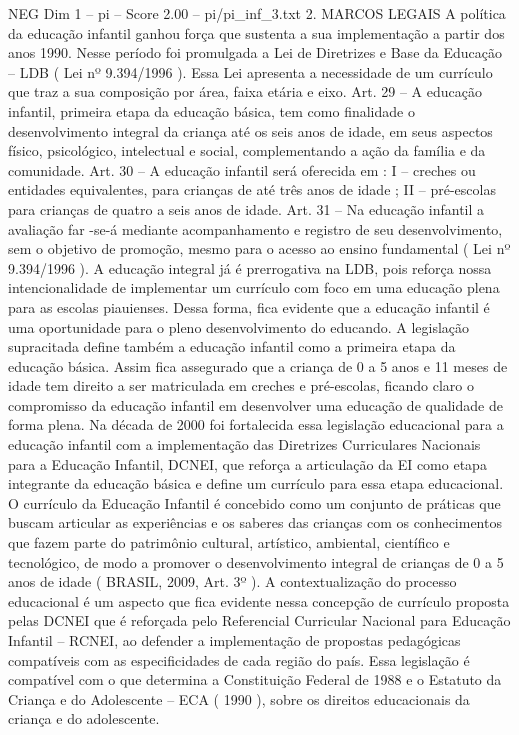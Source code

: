 \begin{textsample}{NEG Dim 1 – pi – Score 2.00 – pi/pi\_inf\_3.txt}  \label{ex:f1_neg_231}
2.
MARCOS LEGAIS A política da educação infantil ganhou força que sustenta a sua implementação a partir dos anos 1990.
Nesse período foi promulgada a Lei de Diretrizes e Base da Educação – LDB ( Lei nº 9.394/1996 ).
Essa Lei apresenta a necessidade de um currículo que traz a sua composição por área, faixa etária e eixo.
Art. 29 – A educação infantil, primeira etapa da educação básica, tem como finalidade o desenvolvimento integral da criança até os seis anos de idade, em seus aspectos físico, psicológico, intelectual e social, complementando a ação da família e da comunidade.
Art. 30 – A educação infantil será oferecida em : I – creches ou entidades equivalentes, para crianças de até três anos de idade ; II – pré-escolas para crianças de quatro a seis anos de idade.
Art. 31 – Na educação infantil a avaliação far -se-á mediante acompanhamento e registro de seu desenvolvimento, sem o objetivo de promoção, mesmo para o acesso ao ensino fundamental ( Lei nº 9.394/1996 ).
A educação integral já é prerrogativa na LDB, pois reforça nossa intencionalidade de implementar um currículo com foco em uma educação plena para as escolas piauienses.
Dessa forma, fica evidente que a educação infantil é uma oportunidade para o pleno desenvolvimento do educando.
A legislação supracitada define também a educação infantil como a primeira etapa da educação básica.
Assim fica assegurado que a criança de 0 a 5 anos e 11 meses de idade tem direito a ser matriculada em creches e pré-escolas, ficando claro o compromisso da educação infantil em desenvolver uma educação de qualidade de forma plena.
Na década de 2000 foi fortalecida essa legislação educacional para a educação infantil com a implementação das Diretrizes Curriculares Nacionais para a Educação Infantil, DCNEI, que reforça a articulação da EI como etapa integrante da educação básica e define um currículo para essa etapa educacional.
O currículo da Educação Infantil é concebido como um conjunto de práticas que buscam articular as experiências e os saberes das crianças com os conhecimentos que fazem parte do patrimônio cultural, artístico, ambiental, científico e tecnológico, de modo a promover o desenvolvimento integral de crianças de 0 a 5 anos de idade ( BRASIL, 2009, Art. 3º ).
A contextualização do processo educacional é um aspecto que fica evidente nessa concepção de currículo proposta pelas DCNEI que é reforçada pelo Referencial Curricular Nacional para Educação Infantil – RCNEI, ao defender a implementação de propostas pedagógicas compatíveis com as especificidades de cada região do país.
Essa legislação é compatível com o que determina a Constituição Federal de 1988 e o Estatuto da Criança e do Adolescente – ECA ( 1990 ), sobre os direitos educacionais da criança e do adolescente.

\end{textsample}

